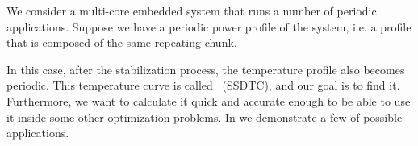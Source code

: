 We consider a multi-core embedded system that runs a number of periodic applications. Suppose we have a periodic power profile of the system, i.e. a profile that is composed of the same repeating chunk.

In this case, after the stabilization process, the temperature profile also becomes periodic. This temperature curve is called \ssdtc\ (SSDTC), and our goal is to find it. Furthermore, we want to calculate it quick and accurate enough to be able to use it inside some other optimization problems. In  we demonstrate a few of possible applications.
